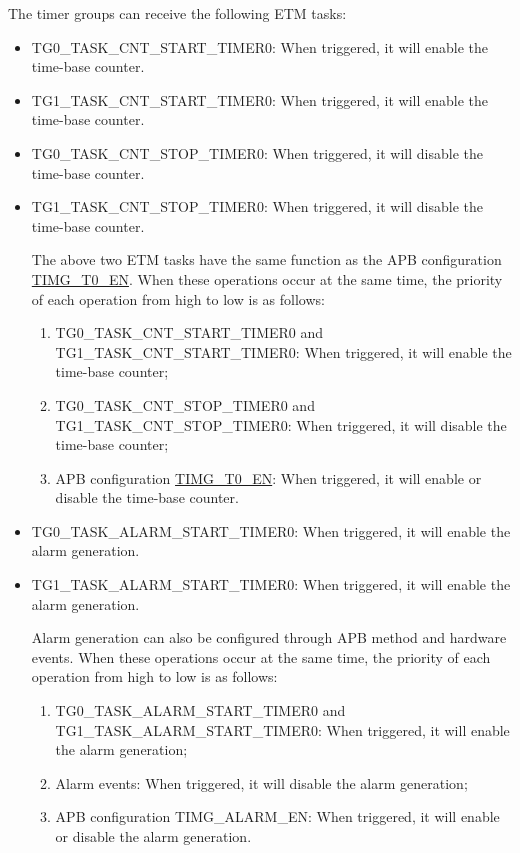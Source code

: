 \documentclass[main\_\_EN.tex]{subfiles}
\begin{document}
The timer groups can receive the following ETM tasks:

\begin{itemize}
\item TG0\_TASK\_CNT\_START\_TIMER0: When triggered, it will enable the time-base counter.
\item TG1\_TASK\_CNT\_START\_TIMER0: When triggered, it will enable the time-base counter.
\item TG0\_TASK\_CNT\_STOP\_TIMER0: When triggered, it will disable the time-base counter.
\item TG1\_TASK\_CNT\_STOP\_TIMER0: When triggered, it will disable the time-base counter.

\begin{tiplisting}
The above two ETM tasks have the same function as the APB configuration \hyperref[fielddesc:TIMGTXEN]{TIMG\_T0\_EN}. When these operations occur at the same time, the priority of each operation from high to low is as follows:

\begin{enumerate}
    \item TG0\_TASK\_CNT\_START\_TIMER0 and TG1\_TASK\_CNT\_START\_TIMER0: When triggered, it will enable the time-base counter;
    \item TG0\_TASK\_CNT\_STOP\_TIMER0 and TG1\_TASK\_CNT\_STOP\_TIMER0: When triggered, it will disable the time-base counter;
    \item APB configuration \hyperref[fielddesc:TIMGTXEN]{TIMG\_T0\_EN}: When triggered, it will enable or disable the time-base counter.
\end{enumerate}
\end{tiplisting}

\item TG0\_TASK\_ALARM\_START\_TIMER0: When triggered, it will enable the alarm generation.
\item TG1\_TASK\_ALARM\_START\_TIMER0: When triggered, it will enable the alarm generation.

\begin{tiplisting}
Alarm generation can also be configured through APB method and hardware events. When these operations occur at the same time, the priority of each operation from high to low is as follows:

\begin{enumerate}
    \item TG0\_TASK\_ALARM\_START\_TIMER0 and TG1\_TASK\_ALARM\_START\_TIMER0: When triggered, it will enable the alarm generation;
    \item Alarm events: When triggered, it will disable the alarm generation;
    \item APB configuration TIMG\_ALARM\_EN: When triggered, it will enable or disable the alarm generation.
\end{enumerate}
\end{tiplisting}


\end{itemize}
\end{document}
